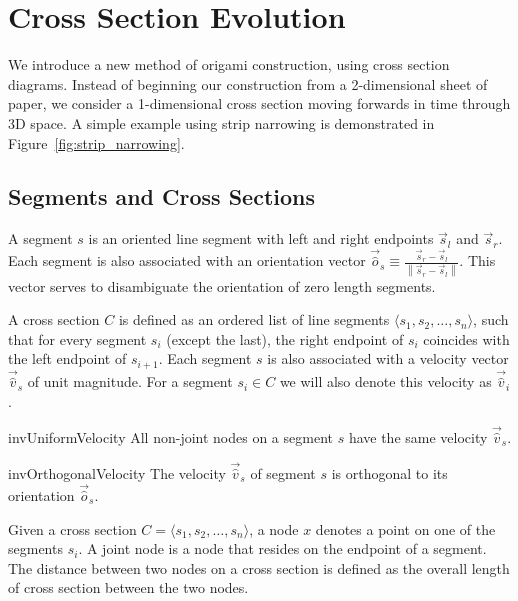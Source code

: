 \section{Cross Section Evolution}
\label{sec:cross_sections}

We introduce a new method of origami construction, using cross section diagrams.
Instead of beginning our construction from a 2-dimensional sheet of paper, we
consider a 1-dimensional cross section moving forwards in time through 3D space.
A simple example using strip narrowing\cite{strip_narrowing} is demonstrated in
Figure~\ref{fig:strip_narrowing}.

\subsection{Segments and Cross Sections}
\label{sec:segments_and_cross_sections}

\begin{definition}
\label{def:segment}
A segment $s$ is an oriented line segment with left and right endpoints $\vec s_l$ and $\vec s_r$.
Each segment is also associated with an orientation vector $\vec{\hat o}_s \equiv\frac{\vec s_r-\vec s_l}{ \left\| \vec s_r-\vec s_l\right\|}$.
This vector serves to disambiguate the orientation of zero length segments.
\end{definition}

\begin{definition}
\label{def:cross_section}
A cross section $C$ is defined as an ordered list of line segments $\langle s_1,s_2,\dots,s_n\rangle$,
such that for every segment $s_i$ (except the last),
the right endpoint of $s_i$ coincides with the left endpoint of $s_{i+1}$.
Each segment $s$ is also associated with a velocity vector $\vec{\hat v}_s$ of unit magnitude.
For a segment $s_i\in C$ we will also denote this velocity as $\vec{\hat v}_i$.
\end{definition}

\vspace{-1pc}
\begin{restatable}{inv}{UniformVelocity}
\label{inv:uniform_velocity}
All non-joint nodes on a segment $s$ have the same velocity $\vec{\hat v}_s$.
\end{restatable}
\vspace{-1pc}

\begin{restatable}{inv}{OrthogonalVelocity}
\label{inv:orthogonal_velocity}
The velocity $\vec{\hat v}_s$ of segment $s$ is orthogonal to its orientation $\vec{\hat o}_s$.
\end{restatable}

\begin{definition}
\label{def:node}
Given a cross section $C = \langle s_1, s_2,\dots, s_n \rangle$, a node $x$ denotes a point on one of the segments $s_i$.
A joint node is a node that resides on the endpoint of a segment.
The distance between two nodes on a cross section is defined as the overall length of cross section between the two nodes.
\end{definition}





%
